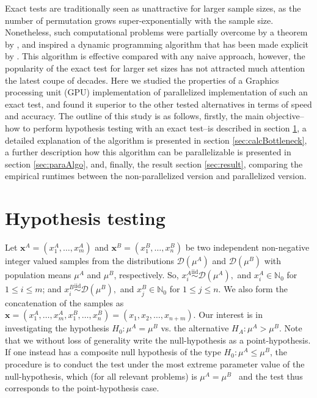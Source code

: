 \documentclass[a4paper]{article}
\begin{document}
Exact tests are traditionally seen as unattractive for larger sample sizes, as the number of permutation grows super-exponentially with the sample size. Nonetheless, such computational problems were partially overcome by a theorem by \cite{pagano_trichtler1983}, and inspired a dynamic programming algorithm that has been made explicit by \cite{zimmermann1985}. This algorithm is effective compared with any naive approach, however, the popularity of the exact test for larger set sizes has not attracted much attention the latest coupe of decades. Here we studied the properties of a Graphics processing unit (GPU) implementation of parallelized implementation of such an exact test, and found it superior to the other tested alternatives in terms of speed and accuracy. The outline of this study is as follows, firstly, the main objective–how to perform hypothesis testing with an exact test–is described in section \ref{sec:PvalueComputation}, a detailed explanation of the algorithm is presented in section \ref{sec:calcBottleneck}, a further description how this algorithm can be parallelizable is presented in section \ref{sec:paraAlgo}, and, finally, the result section \ref{sec:result}, comparing the empirical runtimes between the non-parallelized version and parallelized version.

\section{Hypothesis testing}
\label{sec:PvalueComputation}


Let $\bm{x}^A=(x_1^A,\ldots, x_m^A)$ and $\bm{x}^B=(x^B_1,\ldots,x^B_n)$ be two independent non-negative integer valued samples from the distributions $\mathcal{D}(\mu^A)$ and $\mathcal{D}(\mu^B)$ with population means $\mu^A$ and $\mu^B$, respectively. So, $x^A_i \stackrel{\text{iid}}{\sim} \mathcal{D}(\mu^A),$ and $x^A_i \in \mathbb{N}_0$ for $1\leq i \leq m$; and $x^B_i \stackrel{\text{iid}}{\sim} \mathcal{D}(\mu^B),$ and $x^B_j \in \mathbb{N}_0$ for $1\leq j\leq n$. We also form the concatenation of the samples as $\bm{x}=(x^A_{1},\ldots,x^A_{m},x^B_{1},\ldots,x^B_{n})=(x_1, x_2, \ldots, x_{n+m})$.
Our interest is in investigating the hypothesis $H_0: \mu^A = \mu^B$ vs. the alternative $H_A: \mu^A > \mu^B$. Note that we without loss of generality write the null-hypothesis as a point-hypothesis. If one instead has a composite null hypothesis of the type $H_0: \mu^A \leq \mu^B$, the procedure is to conduct the test under the most extreme parameter value of the null-hypothesis, which (for all relevant problems) is $\mu^A = \mu^B$~\cite[Sect. 5.9]{lehmann2008testing} and the test thus corresponds to the point-hypothesis case.
\end{document}
